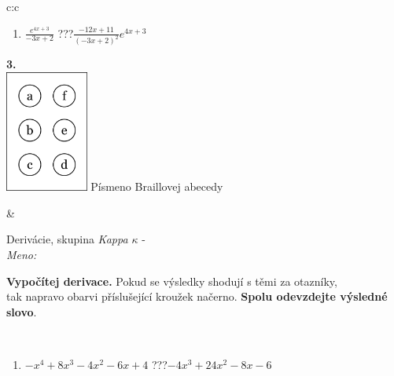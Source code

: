 \documentclass[10pt]{report}
\begin{document}
\begin{tabular}{c:c}
\begin{minipage}[c][104.5mm][t]{0.5\linewidth}
\begin{center}
\begin{minipage}{0.79\linewidth}
\begin{center}
\begin{varwidth}{\linewidth}
\begin{enumerate}
\item $\frac{e^{4x+3}}{-3x+2}$\quad \dotfill\; ???\;\dotfill \quad $\frac{-12x+11}{(-3x+2)^2}e^{4x+3}$
\end{enumerate}
\end{varwidth}
\end{center}
\end{minipage}
\begin{minipage}{0.20\linewidth}
\begin{center}
{\Huge\bfseries 3.} \\[2mm]
\includegraphics[height=40mm]{../images/braille.png}
{\small Písmeno Braillovej abecedy}
\end{center}
\end{minipage}
\end{center}
\end{minipage}
&
\begin{minipage}[c][104.5mm][t]{0.5\linewidth}
\begin{center}
\vspace{7mm}
{\huge Derivácie, skupina \textit{Kappa $\kappa$} -}\\[5mm]
\textit{Meno:}\phantom{xxxxxxxxxxxxxxxxxxxxxxxxxxxxxxxxxxxxxxxxxxxxxxxxxxxxxxxxxxxxxxxxx}\\[5mm]
\begin{minipage}{0.95\linewidth}
\begin{center}
\textbf{Vypočítej derivace.} Pokud se výsledky shodují s těmi za otazníky,\\tak napravo obarvi příslušející kroužek načerno. \textbf{Spolu odevzdejte výsledné slovo}.
\end{center}
\end{minipage}
\\[1mm]
\begin{minipage}{0.79\linewidth}
\begin{center}
\begin{varwidth}{\linewidth}
\begin{enumerate}
\normalsize
\item $-x^4+8x^3-4x^2-6x+4$\quad \dotfill\; ???\;\dotfill \quad $-4x^3+24x^2-8x-6$

\end{enumerate}
\end{varwidth}
\end{center}
\end{minipage}
\end{center}
\end{minipage}
\end{tabular}
\end{document}
